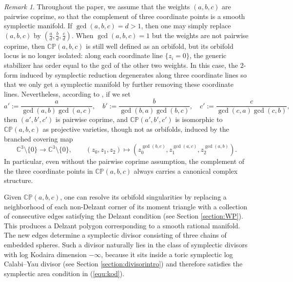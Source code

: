 \documentclass[11pt]{article}
\theoremstyle{definition}
\theoremstyle{remark}
\newtheorem{remark}[theorem]{Remark}
\newcommand{\CP}{\mathbb{CP}}
\newcommand{\C}{\mathbb{C}}
\newcommand{\WCP}{\mathbb{CP}}
\begin{document}
\begin{remark}
  Throughout the paper, we assume that the weights $(a,b,c)$ are pairwise coprime, so that the complement of three coordinate points is a smooth symplectic manifold. If $\gcd(a,b,c)=d>1$, then one may simply replace $(a,b,c)$ by $(\frac{a}{d},\frac{b}{d},\frac{c}{d})$. When $\gcd(a,b,c)=1$ but the weights are not pairwise coprime, then $\WCP(a,b,c)$ is still well defined as an orbifold, but its orbifold locus is no longer isolated: along each coordinate line $\{z_i=0\}$, the generic stabilizer has order equal to the gcd of the other two weights. In this case, the $2$-form induced by symplectic reduction degenerates along three coordinate lines so that we only get a symplectic manifold by further removing these coordinate lines. Nevertheless, according to \cite[1.3.1]{Dolgachev}, if we set
  \[a':=\frac{a}{\gcd(a,b)\gcd(a,c)},\quad b':=\frac{b}{\gcd(b,a)\gcd(b,c)},\quad c':=\frac{c}{\gcd(c,a)\gcd(c,b)},\]
  then $(a',b',c')$ is pairwise coprime, and $\CP(a',b',c')$ is isomorphic to $\CP(a,b,c)$ as projective varieties, though not as orbifolds, induced by the branched covering map
  \[\C^3 \setminus \{0\}\rightarrow \C^3 \setminus \{0\},\qquad (z_0,z_1,z_2)\mapsto (z_0^{\gcd(b,c)},z_1^{\gcd(a,c)},z_2^{\gcd(a,b)}).\]
  In particular, even without the pairwise coprime assumption, the complement of the three coordinate points in $\CP(a,b,c)$ always carries a canonical complex structure.
\end{remark}

Given $\CP(a,b,c)$, one can resolve its orbifold singularities by replacing a neighborhood of each non-Delzant corner of its moment triangle with a collection of consecutive edges satisfying the Delzant condition (see Section \ref{section:WP}). This produces a Delzant polygon corresponding to a smooth rational manifold. The new edges determine a symplectic divisor consisting of three chains of embedded spheres. Such a divisor naturally lies in the class of symplectic divisors with log Kodaira dimension $-\infty$, because it sits inside a toric symplectic log Calabi--Yau divisor (see Section \ref{section:divisorintro}) and therefore satisfies the symplectic area condition in (\ref{equ:kod}).
\end{document}
